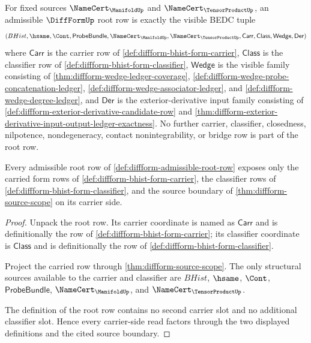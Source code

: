 \begin{definition}
\label{def:diffform-admissible-root-row}
For fixed sources $\NameCert_{\ManifoldUp}$ and
$\NameCert_{\TensorProductUp}$, an admissible $\DiffFormUp$ root row is exactly
the visible BEDC tuple
$$
(BHist,\hsame,\Cont,\mathsf{ProbeBundle},
\NameCert_{\ManifoldUp},\NameCert_{\TensorProductUp},
\mathsf{Carr},\mathsf{Class},\mathsf{Wedge},\mathsf{Der})
$$
where $\mathsf{Carr}$ is the carrier row of
\autoref{def:diffform-bhist-form-carrier}, $\mathsf{Class}$ is the classifier
row of \autoref{def:diffform-bhist-form-classifier}, $\mathsf{Wedge}$ is the
visible family consisting of \autoref{thm:diffform-wedge-ledger-coverage},
\autoref{def:diffform-wedge-probe-concatenation-ledger},
\autoref{def:diffform-wedge-associator-ledger}, and
\autoref{def:diffform-wedge-degree-ledger}, and $\mathsf{Der}$ is the
exterior-derivative input family consisting of
\autoref{def:diffform-exterior-derivative-candidate-row} and
\autoref{thm:diffform-exterior-derivative-input-output-ledger-exactness}.
No further carrier, classifier, closedness, nilpotence, nondegeneracy, contact
nonintegrability, or bridge row is part of the root row.
\end{definition}

\begin{theorem}
\label{thm:diffform-root-row-carrier-scope}
Every admissible root row of \autoref{def:diffform-admissible-root-row}
exposes only the carried form rows of
\autoref{def:diffform-bhist-form-carrier}, the classifier rows of
\autoref{def:diffform-bhist-form-classifier}, and the source boundary of
\autoref{thm:diffform-source-scope} on its carrier side.
\end{theorem}
\begin{proof}
Unpack the root row. Its carrier coordinate is named as
$\mathsf{Carr}$ and is definitionally the row of
\autoref{def:diffform-bhist-form-carrier}; its classifier coordinate is
$\mathsf{Class}$ and is definitionally the row of
\autoref{def:diffform-bhist-form-classifier}.

Project the carried row through \autoref{thm:diffform-source-scope}. The only
structural sources available to the carrier and classifier are $BHist$,
$\hsame$, $\Cont$, $\mathsf{ProbeBundle}$,
$\NameCert_{\ManifoldUp}$, and $\NameCert_{\TensorProductUp}$.

The definition of the root row contains no second carrier slot and no
additional classifier slot. Hence every carrier-side read factors through the
two displayed definitions and the cited source boundary.
\end{proof}

